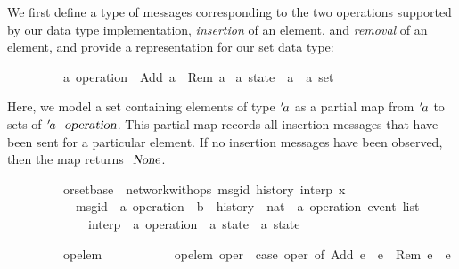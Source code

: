We first define a type of messages corresponding to the two operations supported by our data type implementation, \emph{insertion} of an element, and \emph{removal} of an element, and provide a representation for our set data type:
\vspace{0.375em}
\begin{isabellebody}
\ \ \ \ \ \ \ \ \ {\isacharprime}a\ operation\ {\isacharequal}\ Add\ {\isacharprime}a\ {\isacharbar}\ Rem\ {\isacharprime}a
\quad\quad\quad\quad
{}\ {\isacharprime}a\ state\ {\isacharequal}\ {\isachardoublequoteopen}{\isacharprime}a\ {\isasymRightarrow}\ {\isacharprime}a\ set{\isachardoublequoteclose}
\end{isabellebody}
\vspace{0.375em}
Here, we model a set containing elements of type ${\emph{$\mskip2mu{'}\mskip-2mu$}}a$ as a partial map from ${\emph{$\mskip2mu{'}\mskip-2mu$}}a$ to sets of ${\isacharprime}a\ \isa{operation}$.
This partial map records all insertion messages that have been sent for a particular element.
If no insertion messages have been observed, then the map returns $\isa{None}$.

\begin{isabellebody}
\ \ \ \ \ \ \ \ \ orset{\isacharunderscore}base\ {\isacharequal}\ network{\isacharunderscore}with{\isacharunderscore}ops\ msg{\isacharunderscore}id\ history\ interp\ {\isachardoublequoteopen}{\isasymlambda}x{\isachardot}\ {\isacharbraceleft}{\isacharbraceright}{\isachardoublequoteclose}\isanewline
\ \ \ \ \ \ \ \ \ \ \ msg{\isacharunderscore}id\ {\isacharcolon}{\isacharcolon}\ {\isachardoublequoteopen}{\isacharprime}a\ operation\ {\isasymRightarrow}\ {\isacharprime}b{\isachardoublequoteclose}\ \ history\ {\isacharcolon}{\isacharcolon}\ {\isachardoublequoteopen}nat\ {\isasymRightarrow}\ {\isacharprime}a\ operation\ event\ list{\isachardoublequoteclose}\isanewline
\ \ \ \ \ \ \ \ \ \ \ \ \ interp\ {\isacharcolon}{\isacharcolon}\ {\isachardoublequoteopen}{\isacharprime}a\ operation\ {\isasymRightarrow}\ {\isacharprime}a\ state\ {\isasymrightharpoonup}\ {\isacharprime}a\ state{\isachardoublequoteclose}
\end{isabellebody}

\begin{isabellebody}
\ \ \ \ \ \ \ \ \ op{\isacharunderscore}elem\ \isanewline
\ \ \ \ \ \ \ \ \ \ {\isachardoublequoteopen}op{\isacharunderscore}elem\ oper\ {\isasymequiv}\ case\ oper\ of\ Add\ e\ {\isasymRightarrow}\ e\ {\isacharbar}\ Rem\ e\ {\isasymRightarrow}\ e{\isachardoublequoteclose}
\end{isabellebody}

